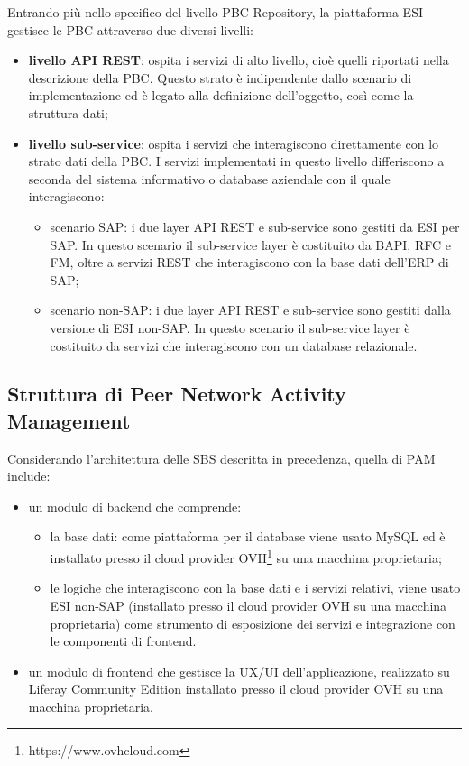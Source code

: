 Entrando più nello specifico del livello \ac{PBC} Repository, la piattaforma \ac{ESI} gestisce le \ac{PBC}
attraverso due diversi livelli:
\begin{itemize}
    \item \textbf{livello API REST}: ospita i servizi di alto livello, cioè quelli riportati nella descrizione
    della \ac{PBC}. Questo strato è indipendente dallo scenario di implementazione ed è legato alla
    definizione dell’oggetto, così come la struttura dati;
    \item \textbf{livello sub-service}: ospita i servizi che interagiscono direttamente con lo strato dati
    della \ac{PBC}. I servizi implementati in questo livello differiscono a seconda del sistema informativo
    o database aziendale con il quale interagiscono:
    \begin{itemize}
        \item scenario SAP: i due layer API REST e sub-service sono gestiti da \ac{ESI} per SAP.
        In questo scenario il sub-service layer è costituito da BAPI, RFC e FM, oltre a servizi REST
        che interagiscono con la base dati dell'\ac{ERP} di SAP;
        \item scenario non-SAP: i due layer API REST e sub-service sono gestiti dalla versione
        di \ac{ESI} non-SAP. In questo scenario il sub-service layer è costituito da servizi che
        interagiscono con un database relazionale.
    \end{itemize}
\end{itemize}

    \subsection{Struttura di Peer Network Activity Management}
    Considerando l’architettura delle \ac{SBS} descritta in precedenza, quella di \ac{PAM} include:
    \begin{itemize}
        \item un modulo di backend che comprende:
        \begin{itemize}
            \item la base dati: come piattaforma per il database viene usato MySQL ed è installato presso il
            cloud provider OVH\footnote{https://www.ovhcloud.com} su una macchina proprietaria;
            \item le logiche che interagiscono con la base dati e i servizi relativi, viene usato
            \ac{ESI} non-SAP (installato presso il cloud provider OVH su una macchina proprietaria) come
            strumento di esposizione dei servizi e integrazione con le componenti di frontend.
        \end{itemize}
        \item un modulo di frontend che gestisce la UX/UI dell’applicazione, realizzato su
        Liferay Community Edition installato presso il cloud provider OVH su una macchina proprietaria.
    \end{itemize}


